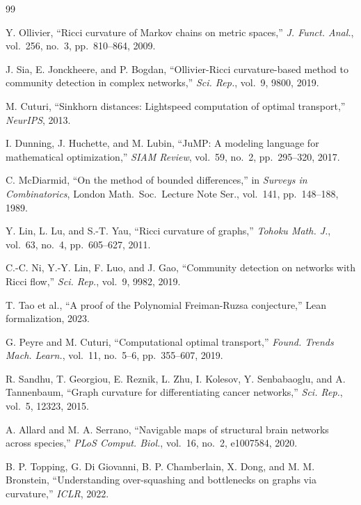 \documentclass[12pt]{article}
\begin{document}
\begin{thebibliography}{99}

Y. Ollivier, ``Ricci curvature of Markov chains on metric spaces,''
\textit{J. Funct. Anal.}, vol.~256, no.~3, pp.~810--864, 2009.

J. Sia, E. Jonckheere, and P. Bogdan, ``Ollivier-Ricci curvature-based method to community
detection in complex networks,'' \textit{Sci. Rep.}, vol.~9, 9800, 2019.

M. Cuturi, ``Sinkhorn distances: Lightspeed computation of optimal transport,''
\textit{NeurIPS}, 2013.

I. Dunning, J. Huchette, and M. Lubin, ``JuMP: A modeling language for mathematical
optimization,'' \textit{SIAM Review}, vol.~59, no.~2, pp.~295--320, 2017.

C. McDiarmid, ``On the method of bounded differences,'' in \textit{Surveys in Combinatorics},
London Math.\ Soc.\ Lecture Note Ser., vol.~141, pp.~148--188, 1989.

Y. Lin, L. Lu, and S.-T. Yau, ``Ricci curvature of graphs,''
\textit{Tohoku Math. J.}, vol.~63, no.~4, pp.~605--627, 2011.

C.-C. Ni, Y.-Y. Lin, F. Luo, and J. Gao, ``Community detection on networks with Ricci
flow,'' \textit{Sci. Rep.}, vol.~9, 9982, 2019.

T. Tao et al., ``A proof of the Polynomial Freiman-Ruzsa conjecture,''
Lean formalization, 2023.

G. Peyre and M. Cuturi, ``Computational optimal transport,''
\textit{Found. Trends Mach. Learn.}, vol.~11, no.~5--6, pp.~355--607, 2019.

R. Sandhu, T. Georgiou, E. Reznik, L. Zhu, I. Kolesov, Y. Senbabaoglu, and A. Tannenbaum,
``Graph curvature for differentiating cancer networks,'' \textit{Sci. Rep.}, vol.~5, 12323,
2015.

A. Allard and M. A. Serrano, ``Navigable maps of structural brain networks across species,''
\textit{PLoS Comput. Biol.}, vol.~16, no.~2, e1007584, 2020.

B. P. Topping, G. Di Giovanni, B. P. Chamberlain, X. Dong, and M. M. Bronstein,
``Understanding over-squashing and bottlenecks on graphs via curvature,'' \textit{ICLR},
2022.


\end{thebibliography}
\end{document}
